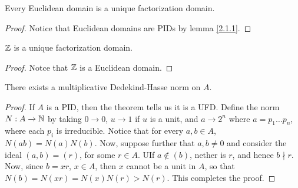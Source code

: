 \begin{corollary}
    Every Euclidean domain is a unique factorization domain.
\end{corollary}
\begin{proof}
    Notice that Euclidean domains are PIDs by lemma \ref{2.1.1}.
\end{proof}
\begin{corollary}
    $\mathbb{Z}$ is a unique factorization domain.
\end{corollary}
\begin{proof}
    Notce that $\mathbb{Z}$ is a Euclidean domain.
\end{proof}
\begin{corollary}
    There exists a multiplicative Dedekind-Hasse norm on $A$.
\end{corollary}
\begin{proof}
    If $A$ is a PID, then the theorem tells us it is a UFD. Define the norm $N:A
    \xrightarrow{} \mathbb{N}$ by taking $0 \xrightarrow{} 0$, $u \xrightarrow{} 1$ if
    $u$ is a unit, and  $a \xrightarrow{} 2^n$ where $a=p_1 \dots p_n$, where
    each $p_i$ is irreducible. Notice that for every  $a,b \in A$,
    $N(ab)=N(a)N(b)$. Now, suppose further that $a,b \neq 0$ and consider the
    ideal  $(a,b)=(r)$, for some $r \in A$. UIf  $a \notin (b)$, nether is $r$,
    and hence  $b \nmid r$. Now, since  $b=xr$,  $x \in A$, then  $x$ cannot be
    a unit in  $A$, so that  $N(b)=N(xr)=N(x)N(r)>N(r)$. This completes the
    proof.
\end{proof}
